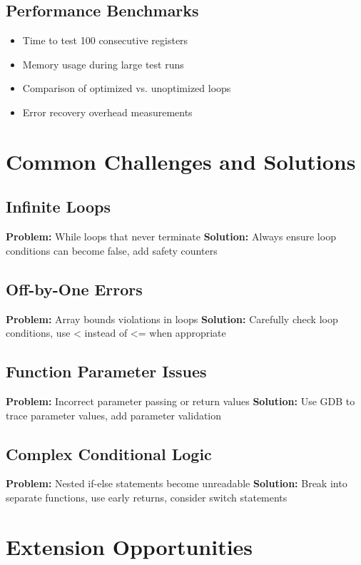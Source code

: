 \documentclass[11pt,a4paper]{article}
\begin{document}
\subsection{Performance Benchmarks}
\begin{itemize}
    \item Time to test 100 consecutive registers
    \item Memory usage during large test runs
    \item Comparison of optimized vs. unoptimized loops
    \item Error recovery overhead measurements
\end{itemize}

\section{Common Challenges and Solutions}

\subsection{Infinite Loops}
\textbf{Problem:} While loops that never terminate
\textbf{Solution:} Always ensure loop conditions can become false, add safety counters

\subsection{Off-by-One Errors}
\textbf{Problem:} Array bounds violations in loops
\textbf{Solution:} Carefully check loop conditions, use < instead of <= when appropriate

\subsection{Function Parameter Issues}
\textbf{Problem:} Incorrect parameter passing or return values
\textbf{Solution:} Use GDB to trace parameter values, add parameter validation

\subsection{Complex Conditional Logic}
\textbf{Problem:} Nested if-else statements become unreadable
\textbf{Solution:} Break into separate functions, use early returns, consider switch statements

\section{Extension Opportunities}
\end{document}
